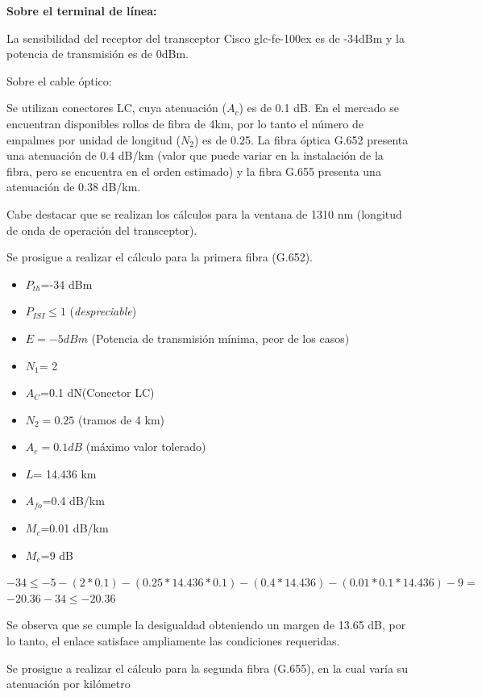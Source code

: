 \documentclass[12pt,a4paper]{book}
\begin{document}
\textbf{Sobre el terminal de línea:}

La sensibilidad del receptor del transceptor Cisco glc-fe-100ex es de -34dBm y la potencia de transmisión es de 0dBm.

Sobre el cable óptico:

Se utilizan conectores LC, cuya atenuación ($A_{c}$) es de 0.1 dB. En el mercado se encuentran disponibles rollos de fibra de 4km, por lo tanto el número de empalmes por unidad de longitud ($N_{2}$) es de 0.25. La fibra óptica G.652 presenta una atenuación de 0.4 dB/km (valor que puede variar en la instalación de la fibra, pero se encuentra en el orden estimado) y la fibra G.655 presenta una atenuación de 0.38 dB/km.

Cabe destacar que se realizan los cálculos para la ventana de 1310 nm (longitud de onda de operación del transceptor).

Se prosigue a realizar el cálculo para la primera fibra (G.652).

\begin{itemize}
\item $P_{th}$=-34 dBm
\item $P_{ISI} \leq 1$ (\textit{despreciable})
\item $E=-5 dBm$ (Potencia de transmisión mínima, peor de los casos)
\item $N_{1}$= 2
\item $A_{C}$=0.1 dN(Conector LC)
\item $N_{2}=0.25$ (tramos de 4 km)
\item $A_{e}=0.1 dB$ (máximo valor tolerado)
\item $L$= 14.436 km
\item $A_{fo}$=0.4 dB/km
\item $M_{c}$=0.01 dB/km
\item $M_{e}$=9 dB
\end{itemize}

\begin{center}

\noindent$-34 \leq -5-(2*0.1)-(0.25*14.436*0.1)-(0.4*14.436)-(0.01*0.1*14.436)-9=$
\noindent $-20.36 - 34 \leq -20.36$
\end{center}

\medskip

Se observa que se cumple la desigualdad obteniendo un margen de 13.65 dB, por lo tanto, el enlace satisface ampliamente las condiciones requeridas.

Se prosigue a realizar el cálculo para la segunda fibra (G.655), en la cual varía su atenuación por kilómetro
\end{document}
